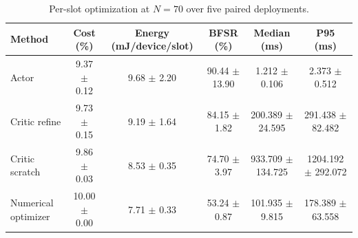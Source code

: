 \begin{table}[t]
\centering
\caption{Per-slot optimization at $N=70$ over five paired deployments.}
\label{tab:per_slot}
\footnotesize
\begin{tabular}{lccccc}
\hline
Method & Cost (\%) & Energy (mJ/device/slot) & BFSR (\%) & Median (ms) & P95 (ms) \\
\hline
Actor & 9.37 $\pm$ 0.12 & 9.68 $\pm$ 2.20 & 90.44 $\pm$ 13.90 & 1.212 $\pm$ 0.106 & 2.373 $\pm$ 0.512 \\
Critic refine & 9.73 $\pm$ 0.15 & 9.19 $\pm$ 1.64 & 84.15 $\pm$ 1.82 & 200.389 $\pm$ 24.595 & 291.438 $\pm$ 82.482 \\
Critic scratch & 9.86 $\pm$ 0.03 & 8.53 $\pm$ 0.35 & 74.70 $\pm$ 3.97 & 933.709 $\pm$ 134.725 & 1204.192 $\pm$ 292.072 \\
Numerical optimizer & 10.00 $\pm$ 0.00 & 7.71 $\pm$ 0.33 & 53.24 $\pm$ 0.87 & 101.935 $\pm$ 9.815 & 178.389 $\pm$ 63.558 \\
\hline
\end{tabular}
\end{table}
